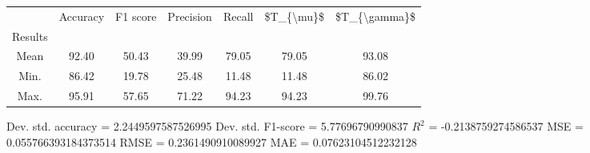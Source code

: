\begin{tabular}{|c|c|c|c|c|c|c|}
\toprule
{} &  Accuracy &  F1 score &  Precision &  Recall &  \$T\_\{\textbackslash mu\}\$ &  \$T\_\{\textbackslash gamma\}\$ \\
Results &           &           &            &         &            &               \\
\hline
Mean    &     92.40 &     50.43 &      39.99 &   79.05 &      79.05 &         93.08 \\
Min.    &     86.42 &     19.78 &      25.48 &   11.48 &      11.48 &         86.02 \\
Max.    &     95.91 &     57.65 &      71.22 &   94.23 &      94.23 &         99.76 \\
\bottomrule
\end{tabular}

 Dev. std. accuracy = 2.2449597587526995
 Dev. std. F1-score = 5.77696790990837
 $R^2$ = -0.2138759274586537
 MSE = 0.055766393184373514
 RMSE = 0.2361490910089927
 MAE = 0.07623104512232128